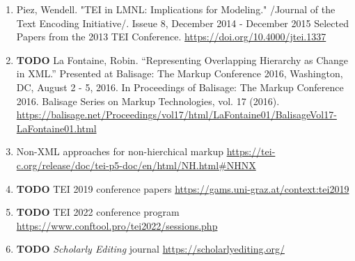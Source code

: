 \documentclass[11pt]{article}
\begin{document}
\begin{enumerate}
\item Piez, Wendell. "TEI in LMNL: Implications for Modeling." /Journal of
\label{sec:org1f5cd31}
the Text Encoding Initiative/. Isseue 8, December 2014 - December 2015
Selected Papers from the 2013 TEI
Conference. \url{https://doi.org/10.4000/jtei.1337} 
\item {\bfseries\sffamily TODO} La Fontaine, Robin. “Representing Overlapping Hierarchy as
\label{sec:orgc395294}
Change in XML.” Presented at Balisage: The Markup Conference 2016,
Washington, DC, August 2 - 5, 2016. In Proceedings of Balisage: The
Markup Conference 2016. Balisage Series on Markup Technologies,
vol. 17 (2016). \url{https://balisage.net/Proceedings/vol17/html/LaFontaine01/BalisageVol17-LaFontaine01.html} 
\item Non-XML approaches for non-hierchical markup
\label{sec:org3a1d6ce}
\url{https://tei-c.org/release/doc/tei-p5-doc/en/html/NH.html\#NHNX} 

\item {\bfseries\sffamily TODO} TEI 2019 conference papers
\label{sec:org7be5c75}
\url{https://gams.uni-graz.at/context:tei2019} 
\item {\bfseries\sffamily TODO} TEI 2022 conference program
\label{sec:org7c51b5e}
\url{https://www.conftool.pro/tei2022/sessions.php} 
\item {\bfseries\sffamily TODO} \emph{Scholarly Editing} journal
\label{sec:orge006414}
\url{https://scholarlyediting.org/}
\end{enumerate}
\end{document}
